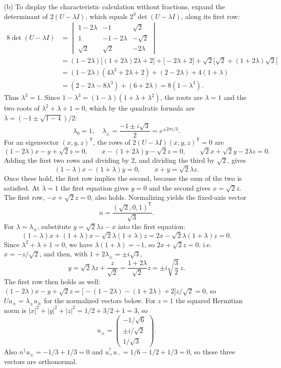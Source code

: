 (b) To display the characteristic calculation without fractions,
expand the determinant of $2(U-\lambda I)$, which equals
$2^3\det(U-\lambda I)$, along its first row:
\begin{align*}
8\det(U-\lambda I)
&=\begin{vmatrix}
1-2\lambda&-1&\sqrt2\\1&-1-2\lambda&-\sqrt2\\
\sqrt2&\sqrt2&-2\lambda
\end{vmatrix}\\
&=(1-2\lambda)\bigl[(1+2\lambda)2\lambda+2\bigr]
 +\bigl[-2\lambda+2\bigr]
 +\sqrt2\bigl[\sqrt2+(1+2\lambda)\sqrt2\bigr]\\
&=(1-2\lambda)(4\lambda^2+2\lambda+2)
  +(2-2\lambda)+4(1+\lambda)\\
&=(2-2\lambda-8\lambda^3)+(6+2\lambda)
=8(1-\lambda^3).
\end{align*}
Thus $\lambda^3=1$. Since $1-\lambda^3=(1-\lambda)(1+\lambda+\lambda^2)$,
the roots are $\lambda=1$ and the two roots of $\lambda^2+\lambda+1=0$,
which by the quadratic formula are $\lambda=(-1\pm\sqrt{1-4})/2$:
\[
\boxed{\lambda_0=1,\quad
\lambda_\pm=\frac{-1\pm i\sqrt3}{2}=e^{\pm2\pi i/3}.}
\]
For an eigenvector $(x,y,z)^{\mathsf T}$, the rows of
$2(U-\lambda I)(x,y,z)^{\mathsf T}=0$ are
\[
(1-2\lambda)x-y+\sqrt2z=0,\qquad
x-(1+2\lambda)y-\sqrt2z=0,\qquad
\sqrt2x+\sqrt2y-2\lambda z=0.
\]
Adding the first two rows and dividing by $2$, and dividing the third
by $\sqrt2$, gives
\[
(1-\lambda)x-(1+\lambda)y=0,\qquad
x+y=\sqrt2\lambda z.
\]
Once these hold, the first row implies the second, because the sum
of the two is satisfied.
At $\lambda=1$ the first equation gives $y=0$ and the second gives
$x=\sqrt2 z$. The first row, $-x+\sqrt2z=0$, also holds. Normalizing
yields the fixed-axis vector
\[
\boxed{n=\frac{(\sqrt2,0,1)^{\mathsf T}}{\sqrt3}.}
\]
For $\lambda=\lambda_\pm$, substitute
$y=\sqrt2\lambda z-x$ into the first equation:
\[
(1-\lambda)x+(1+\lambda)x-\sqrt2\lambda(1+\lambda)z
=2x-\sqrt2\lambda(1+\lambda)z=0.
\]
Since $\lambda^2+\lambda+1=0$, we have $\lambda(1+\lambda)=-1$, so
$2x+\sqrt2z=0$, i.e.\ $x=-z/\sqrt2$, and then, with
$1+2\lambda_\pm=\pm i\sqrt3$,
\[
y=\sqrt2\lambda z+\frac{z}{\sqrt2}
=\frac{1+2\lambda}{\sqrt2}z
=\pm i\sqrt{\frac32}\,z.
\]
The first row then holds as well:
$(1-2\lambda)x-y+\sqrt2z
=\bigl[-(1-2\lambda)-(1+2\lambda)+2\bigr]z/\sqrt2=0$, so
$Uu_\pm=\lambda_\pm u_\pm$ for the normalized vectors below.
For $z=1$ the squared Hermitian norm is
$|x|^2+|y|^2+|z|^2=1/2+3/2+1=3$, so
\[
\boxed{u_\pm=
\begin{pmatrix}-1/\sqrt6\\ \pm i/\sqrt2\\1/\sqrt3\end{pmatrix}.}
\]
Also $n^\dagger u_\pm=-1/3+1/3=0$ and
$u_+^\dagger u_-=1/6-1/2+1/3=0$, so these three vectors are
orthonormal.

